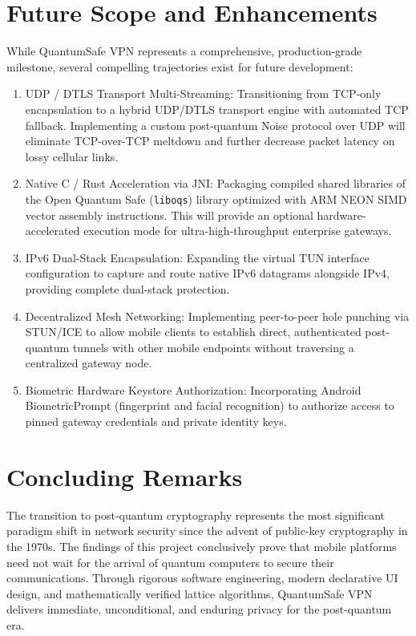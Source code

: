 \section{Future Scope and Enhancements}
\label{sec:future_scope}

While QuantumSafe VPN represents a comprehensive, production-grade milestone, several compelling trajectories exist for future development:

\begin{enumerate}
    \item UDP / DTLS Transport Multi-Streaming: Transitioning from TCP-only encapsulation to a hybrid UDP/DTLS transport engine with automated TCP fallback. Implementing a custom post-quantum Noise protocol over UDP will eliminate TCP-over-TCP meltdown and further decrease packet latency on lossy cellular links.
    \item Native C / Rust Acceleration via JNI: Packaging compiled shared libraries of the Open Quantum Safe (\texttt{liboqs}) library optimized with ARM NEON SIMD vector assembly instructions. This will provide an optional hardware-accelerated execution mode for ultra-high-throughput enterprise gateways.
    \item IPv6 Dual-Stack Encapsulation: Expanding the virtual TUN interface configuration to capture and route native IPv6 datagrams alongside IPv4, providing complete dual-stack protection.
    \item Decentralized Mesh Networking: Implementing peer-to-peer hole punching via STUN/ICE to allow mobile clients to establish direct, authenticated post-quantum tunnels with other mobile endpoints without traversing a centralized gateway node.
    \item Biometric Hardware Keystore Authorization: Incorporating Android BiometricPrompt (fingerprint and facial recognition) to authorize access to pinned gateway credentials and private identity keys.
\end{enumerate}

\section{Concluding Remarks}
\label{sec:concluding_remarks}

The transition to post-quantum cryptography represents the most significant paradigm shift in network security since the advent of public-key cryptography in the 1970s. The findings of this project conclusively prove that mobile platforms need not wait for the arrival of quantum computers to secure their communications. Through rigorous software engineering, modern declarative UI design, and mathematically verified lattice algorithms, QuantumSafe VPN delivers immediate, unconditional, and enduring privacy for the post-quantum era.
